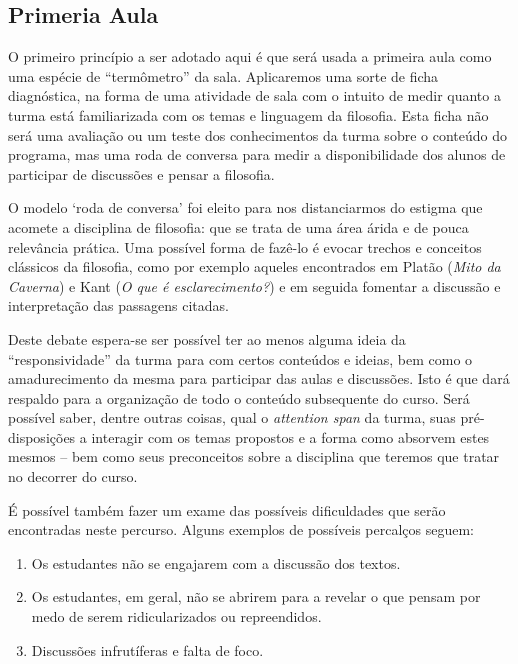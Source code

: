 \documentclass[12pt,a4paper]{article}
\begin{document}
	\subsection*{Primeria Aula}

	O primeiro princípio a ser adotado aqui é que será usada a primeira aula 
	como uma espécie de ``termômetro'' da sala. Aplicaremos uma sorte de 
	ficha diagnóstica, na forma de uma atividade de sala com o intuito 
	de medir quanto a turma está familiarizada com os temas e linguagem 
	da filosofia. Esta ficha não será uma avaliação ou um teste dos 
	conhecimentos da turma sobre o conteúdo do programa, mas uma roda de 
	conversa para medir a disponibilidade dos alunos de participar de 
	discussões e pensar a filosofia. 
	
	O modelo `roda de conversa' foi eleito 
	para nos distanciarmos do estigma que acomete a disciplina de filosofia:
	que se trata de uma área árida e de pouca relevância prática.
	Uma possível forma de fazê-lo é evocar trechos e conceitos 
	clássicos da filosofia, como por exemplo aqueles encontrados em 
	Platão (\textit{Mito da Caverna}) e Kant (\textit{O que é 
	esclarecimento?}) e em seguida fomentar a discussão e interpretação das 
	passagens citadas.

	Deste debate espera-se ser possível ter ao menos alguma ideia da 
	``responsividade'' da turma para com certos conteúdos e ideias, 
	bem como o amadurecimento da mesma para participar das aulas 
	e discussões. Isto é que dará respaldo para a organização de 
	todo o conteúdo subsequente do curso. Será possível saber, dentre 
	outras coisas, qual o \emph{attention span} da turma, suas 
	pré-disposições a interagir com os temas propostos e a forma 
	como absorvem estes mesmos -- bem como seus preconceitos sobre 
	a disciplina que teremos que tratar no decorrer do curso. 
	
	É possível também fazer um exame das possíveis dificuldades 
	que serão encontradas neste percurso. Alguns exemplos de possíveis 
	percalços seguem:

	\begin{enumerate}[label=\alph*)]
		\item	\label{prob:engaj} 
			Os estudantes não se engajarem com a discussão 
			dos textos.

		\item	\label{prob:ridic}
			Os estudantes, em geral, não se abrirem para a 
			revelar o que pensam por medo de serem ridicularizados
			ou repreendidos.

		\item	\label{prob:disc}
			Discussões infrutíferas e falta de foco.
	\end{enumerate}
	
\end{document}
